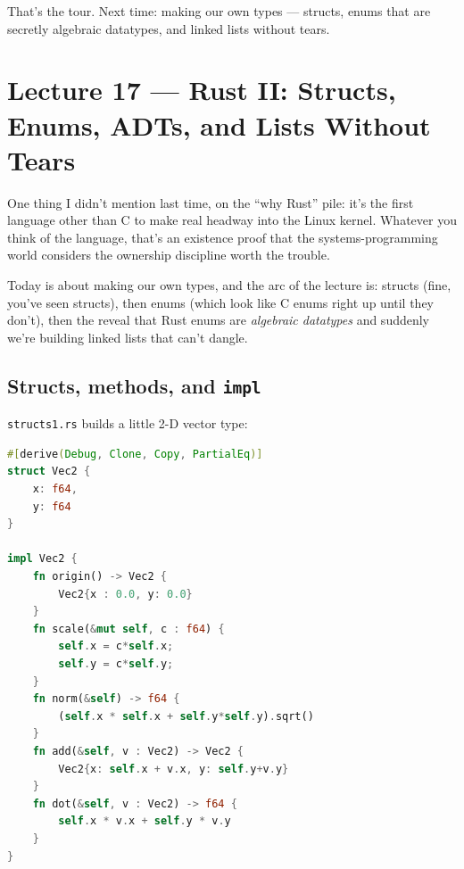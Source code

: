 \documentclass[11pt]{article}
\begin{document}
That's the tour. Next time: making our own types --- structs, enums
that are secretly algebraic datatypes, and linked lists without
tears.

\section{Lecture 17 --- Rust II: Structs, Enums, ADTs, and Lists Without Tears}

One thing I didn't mention last time, on the ``why Rust'' pile:
it's the first language other than C to make real headway into the
Linux kernel. Whatever you think of the language, that's an
existence proof that the systems-programming world considers the
ownership discipline worth the trouble.

Today is about making our own types, and the arc of the lecture is:
structs (fine, you've seen structs), then enums (which look like C
enums right up until they don't), then the reveal that Rust enums
are \emph{algebraic datatypes} and suddenly we're building linked
lists that can't dangle.

\subsection*{Structs, methods, and \texttt{impl}}

\texttt{structs1.rs} builds a little 2-D vector type:

\begin{lstlisting}[language=Rust]
#[derive(Debug, Clone, Copy, PartialEq)]
struct Vec2 {
    x: f64,
    y: f64
}

impl Vec2 {
    fn origin() -> Vec2 {
        Vec2{x : 0.0, y: 0.0}
    }
    fn scale(&mut self, c : f64) {
        self.x = c*self.x;
        self.y = c*self.y;
    }
    fn norm(&self) -> f64 {
        (self.x * self.x + self.y*self.y).sqrt()
    }
    fn add(&self, v : Vec2) -> Vec2 {
        Vec2{x: self.x + v.x, y: self.y+v.y}
    }
    fn dot(&self, v : Vec2) -> f64 {
        self.x * v.x + self.y * v.y
    }
}
\end{lstlisting}
\end{document}
